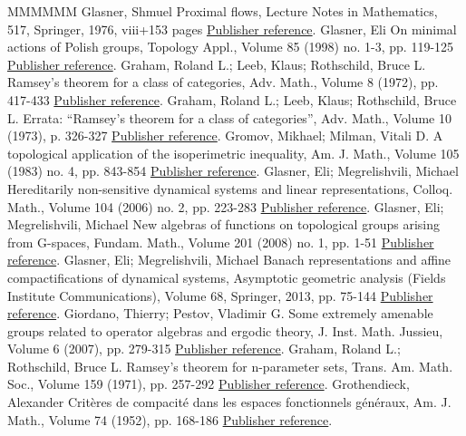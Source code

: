 \begin{thebibliography}{MMMMMM}
 Glasner, Shmuel Proximal flows, Lecture Notes in Mathematics, 517, Springer, 1976, viii+153 pages \href{https://ahl.centre-mersenne.org/item/AHL_2019__2__149_0/#Gl}{Publisher reference}.
 Glasner, Eli On minimal actions of Polish groups, Topology Appl., Volume 85 (1998) no. 1-3, pp. 119-125 \href{https://ahl.centre-mersenne.org/item/AHL_2019__2__149_0/#Gl1}{Publisher reference}.
 Graham, Roland L.; Leeb, Klaus; Rothschild, Bruce L. Ramsey’s theorem for a class of categories, Adv. Math., Volume 8 (1972), pp. 417-433 \href{https://ahl.centre-mersenne.org/item/AHL_2019__2__149_0/#GLR1}{Publisher reference}.
 Graham, Roland L.; Leeb, Klaus; Rothschild, Bruce L. Errata: “Ramsey’s theorem for a class of categories”, Adv. Math., Volume 10 (1973), p. 326-327 \href{https://ahl.centre-mersenne.org/item/AHL_2019__2__149_0/#GLR2}{Publisher reference}.
 Gromov, Mikhael; Milman, Vitali D. A topological application of the isoperimetric inequality, Am. J. Math., Volume 105 (1983) no. 4, pp. 843-854 \href{https://ahl.centre-mersenne.org/item/AHL_2019__2__149_0/#GM}{Publisher reference}.
 Glasner, Eli; Megrelishvili, Michael Hereditarily non-sensitive dynamical systems and linear representations, Colloq. Math., Volume 104 (2006) no. 2, pp. 223-283 \href{https://ahl.centre-mersenne.org/item/AHL_2019__2__149_0/#GlM1}{Publisher reference}.
 Glasner, Eli; Megrelishvili, Michael New algebras of functions on topological groups arising from G-spaces, Fundam. Math., Volume 201 (2008) no. 1, pp. 1-51 \href{https://ahl.centre-mersenne.org/item/AHL_2019__2__149_0/#GlM2}{Publisher reference}.
 Glasner, Eli; Megrelishvili, Michael Banach representations and affine compactifications of dynamical systems, Asymptotic geometric analysis (Fields Institute Communications), Volume 68, Springer, 2013, pp. 75-144 \href{https://ahl.centre-mersenne.org/item/AHL_2019__2__149_0/#GlM3}{Publisher reference}.
 Giordano, Thierry; Pestov, Vladimir G. Some extremely amenable groups related to operator algebras and ergodic theory, J. Inst. Math. Jussieu, Volume 6 (2007), pp. 279-315 \href{https://ahl.centre-mersenne.org/item/AHL_2019__2__149_0/#GP}{Publisher reference}.
 Graham, Roland L.; Rothschild, Bruce L. Ramsey’s theorem for n-parameter sets, Trans. Am. Math. Soc., Volume 159 (1971), pp. 257-292 \href{https://ahl.centre-mersenne.org/item/AHL_2019__2__149_0/#GR}{Publisher reference}.
 Grothendieck, Alexander Critères de compacité dans les espaces fonctionnels généraux, Am. J. Math., Volume 74 (1952), pp. 168-186 \href{https://ahl.centre-mersenne.org/item/AHL_2019__2__149_0/#Grothendieck}{Publisher reference}.

\end{thebibliography}
